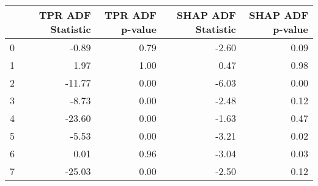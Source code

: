 \begin{tabular}{lrrrr}
\toprule
 & TPR ADF Statistic & TPR ADF p-value & SHAP ADF Statistic & SHAP ADF p-value \\
\midrule
0 & -0.89 & 0.79 & -2.60 & 0.09 \\
1 & 1.97 & 1.00 & 0.47 & 0.98 \\
2 & -11.77 & 0.00 & -6.03 & 0.00 \\
3 & -8.73 & 0.00 & -2.48 & 0.12 \\
4 & -23.60 & 0.00 & -1.63 & 0.47 \\
5 & -5.53 & 0.00 & -3.21 & 0.02 \\
6 & 0.01 & 0.96 & -3.04 & 0.03 \\
7 & -25.03 & 0.00 & -2.50 & 0.12 \\
\bottomrule
\end{tabular}
